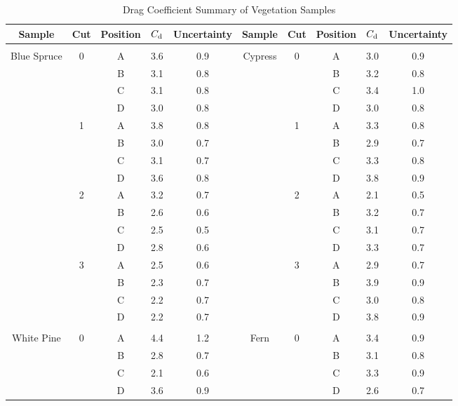 \documentclass[12pt]{article}
\begin{document}
\begin{table}[!]
\caption{Drag Coefficient Summary of Vegetation Samples}
\label{tab:SumTable}
\centering

	\footnotesize
	\begin{tabular}{cccccccccc}	
			\hline
\textbf{Sample}		&	\textbf{Cut}	&\textbf{Position}& $C_{\rm d}$ 	&\textbf{Uncertainty}	&\textbf{Sample}	&	\textbf{Cut}	&\textbf{Position}& 	\textbf{$C_{\rm d}$ }&\textbf{Uncertainty}\\
\hline
\\[0.05cm]
Blue Spruce				&	0	&	A	& 	3.6	&	0.9				& Cypress       		&	0	&	A	& 	3.0	&	0.9	\\
					&		&	B	& 	3.1	&	0.8				&				&		&	B	& 	3.2	&	0.8	\\
					&		&	C	& 	3.1	&	0.8				&				&		&	C	& 	3.4	&	1.0	\\
					&		&	D	& 	3.0	&	0.8				&				&		&	D	& 	3.0	&	0.8	\\
					&	1	&	A	& 	3.8	&	0.8				&				&	1	&	A	& 	3.3	&	0.8	\\
					&		&	B	& 	3.0	&	0.7				&				&		&	B	& 	2.9	&	0.7	\\
					&		&	C	& 	3.1	&	0.7				&				&		&	C	& 	3.3	&	0.8	\\
					&		&	D	& 	3.6	&	0.8				&				&		&	D	& 	3.8	&	0.9	\\
					&	2	&	A	& 	3.2	&	0.7				&				&	2	&	A	& 	2.1	&	0.5	\\
					&		&	B	& 	2.6	&	0.6				&				&		&	B	& 	3.2	&	0.7	\\
					&		&	C	& 	2.5	&	0.5				&				&		&	C	& 	3.1	&	0.7	\\
					&		&	D	& 	2.8	&	0.6				&				&		&	D	& 	3.3	&	0.7	\\
					&	3	&	A	& 	2.5	&	0.6				&				&	3	&	A	& 	2.9	&	0.7	\\
					&		&	B	& 	2.3	&	0.7				&				&		&	B	& 	3.9	&	0.9	\\
					&		&	C	& 	2.2	&	0.7				&				&		&	C	& 	3.0	&	0.8	\\
					&		&	D	& 	2.2	&	0.7				&				&		&	D	& 	3.8	&	0.9	\\
					&		&		& 		&					&				&		&		& 		&		\\
White Pine	       			 &	0	&	A	& 	4.4	&	1.2				& Fern	       		 &	0	&	A	& 	3.4	&	0.9	\\
					&		&	B	& 	2.8	&	0.7				&				&		&	B	& 	3.1	&	0.8	\\	
					&		&	C	& 	2.1	&	0.6				&				&		&	C	& 	3.3	&	0.9	\\
					&		&	D	& 	3.6	&	0.9				&				&		&	D	& 	2.6	&	0.7	\\

\end{tabular}
\end{table}
\end{document}

